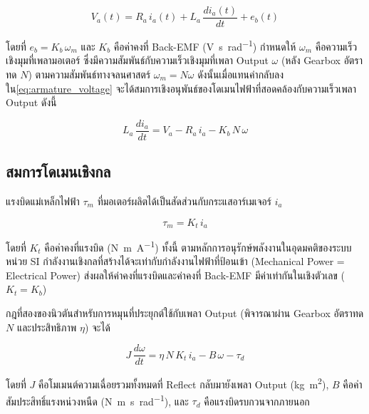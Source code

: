 \begin{equation}
    V_a(t) = R_a\, i_a(t) + L_a\, \frac{di_a(t)}{dt} + e_b(t)
    \label{eq:armature_voltage}
\end{equation}

\noindent โดยที่ $e_b = K_b\,\omega_m$ และ $K_b$ คือค่าคงที่ Back-EMF (\si{\volt\second\per\radian})
กำหนดให้ $\omega_m$ คือความเร็วเชิงมุมที่เพลามอเตอร์ ซึ่งมีความสัมพันธ์กับความเร็วเชิงมุมที่เพลา Output $\omega$ (หลัง Gearbox อัตราทด $N$) ตามความสัมพันธ์ทางจลนศาสตร์ $\omega_m = N\omega$
ดังนั้นเมื่อแทนค่ากลับลงใน\cref{eq:armature_voltage} จะได้สมการเชิงอนุพันธ์ของโดเมนไฟฟ้าที่สอดคล้องกับความเร็วเพลา Output ดังนี้

\begin{equation}
    L_a\, \frac{di_a}{dt} = V_a - R_a\, i_a - K_b\,N\,\omega
    \label{eq:electrical_ode}
\end{equation}

\subsection{สมการโดเมนเชิงกล}
\label{subsec:mechanical_eq}

แรงบิดแม่เหล็กไฟฟ้า $\tau_m$ ที่มอเตอร์ผลิตได้เป็นสัดส่วนกับกระแสอาร์เมเจอร์ $i_a$

\begin{equation}
    \tau_m = K_t\, i_a
    \label{eq:motor_torque}
\end{equation}

\noindent โดยที่ $K_t$ คือค่าคงที่แรงบิด (\si{\newton\metre\per\ampere})
ทั้งนี้ ตามหลักการอนุรักษ์พลังงานในอุดมคติของระบบหน่วย SI กำลังงานเชิงกลที่สร้างได้จะเท่ากับกำลังงานไฟฟ้าที่ป้อนเข้า (Mechanical Power = Electrical Power) ส่งผลให้ค่าคงที่แรงบิดและค่าคงที่ Back-EMF มีค่าเท่ากันในเชิงตัวเลข ($K_t = K_b$)

กฎที่สองของนิวตันสำหรับการหมุนที่ประยุกต์ใช้กับเพลา Output (พิจารณาผ่าน Gearbox อัตราทด $N$ และประสิทธิภาพ $\eta$) จะได้

\begin{equation}
    J\, \frac{d\omega}{dt} = \eta\, N\, K_t\, i_a - B\,\omega - \tau_d
    \label{eq:mechanical_ode}
\end{equation}

\noindent โดยที่ $J$ คือโมเมนต์ความเฉื่อยรวมทั้งหมดที่ Reflect กลับมายังเพลา Output (\si{\kilogram\metre\squared}),
$B$ คือค่าสัมประสิทธิ์แรงหน่วงหนืด (\si{\newton\metre\second\per\radian}),
และ $\tau_d$ คือแรงบิดรบกวนจากภายนอก

